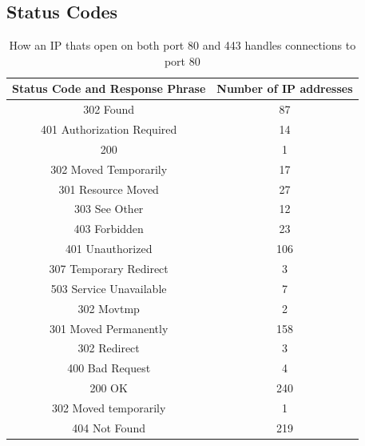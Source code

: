 \documentclass[a4wide,leqno,12pt]{report}
\begin{document}
\subsection{Status Codes}
\begin{table}[H]
\centering
\begin{tabular}{|| c c ||}
 \hline
  Status Code and Response Phrase & Number of IP addresses  \\ [0.5ex]
 \hline\hline
 302 Found			&87\\
401 Authorization Required	&14\\
200				&1\\
302 Moved Temporarily		&17\\
301 Resource Moved		&27\\
303 See Other			&12\\
403 Forbidden			&23\\
401 Unauthorized		&106\\
307 Temporary Redirect		&3\\
503 Service Unavailable		&7\\
302 Movtmp			&2\\
301 Moved Permanently		&158\\
302 Redirect			&3\\
400 Bad Request			&4\\
200 OK				&240\\
302 Moved temporarily		&1\\
404 Not Found			&219\\[1ex]
 \hline
\end{tabular}
\caption{How an IP thats open on both port 80 and 443 handles connections to port 80}
\label{table:status_code_both_port_80}
\end{table}

\begin{table}[H]
\centering
\caption{Status codes of IPs on a Port 80 (only)  making connections to port 80:}
\label{table:status_code_both_port_80}
\end{table}
\end{document}
